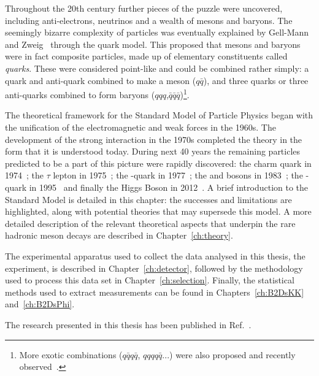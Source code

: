 Throughout the 20th century further pieces of the puzzle were uncovered, including anti-electrons, neutrinos and a wealth of mesons and baryons. 
The seemingly bizarre complexity of particles was eventually explained by Gell-Mann~\cite{GellMann:1964nj} and Zweig~\cite{Zweig:1964jf} through the quark model. This proposed that mesons and baryons were in fact composite particles, made up of elementary constituents called \emph{quarks}. These were considered point-like and could be combined rather simply: a quark and anti-quark combined to make a meson ($q\bar{q}$), and three quarks or three anti-quarks combined to form baryons ($qqq$,$\bar{q}\bar{q}\bar{q}$)\footnote{More exotic combinations ($q\bar{q}q\bar{q}$, $qqqq\bar{q}$...) were also proposed and recently observed~\cite{PhysRevLett.91.262001,PhysRevLett.115.072001}.}.     

The theoretical framework for the Standard Model of Particle Physics began with the unification of the electromagnetic and weak forces in the 1960s. The development of the strong interaction in the 1970s completed the theory in the form that it is understood today. During next 40 years the remaining particles predicted to be a part of this picture were rapidly discovered: the charm quark in 1974~\cite{PhysRevLett.33.1406,PhysRevLett.33.1404}; the $\tau$ lepton in 1975~\cite{PhysRevLett.35.1489}; the \bquark-quark in 1977~\cite{PhysRevLett.39.252}; the \W and \Z bosons in 1983~\cite{ARNISON1983103,BANNER1983476}; the \tquark-quark in 1995~\cite{PhysRevLett.74.2626,PhysRevLett.74.2422} and finally the Higgs Boson in 2012~\cite{20121,201230}.      
A brief introduction to the Standard Model is detailed in this chapter: the successes and limitations are highlighted, along with potential theories that may supersede this model.
A more detailed description of the relevant theoretical aspects that underpin the rare hadronic \B meson decays are described in Chapter~\ref{ch:theory}. 

The experimental apparatus used to collect the data analysed in this thesis, the \lhcb experiment, is described in Chapter~\ref{ch:detector}, followed by the methodology used to process this data set in Chapter~\ref{ch:selection}. Finally, the statistical methods used to extract measurements can be found in Chapters~\ref{ch:B2DsKK} and~\ref{ch:B2DsPhi}.

The research presented in this thesis has been published in Ref.~\cite{LHCb-PAPER-2017-032}. 



